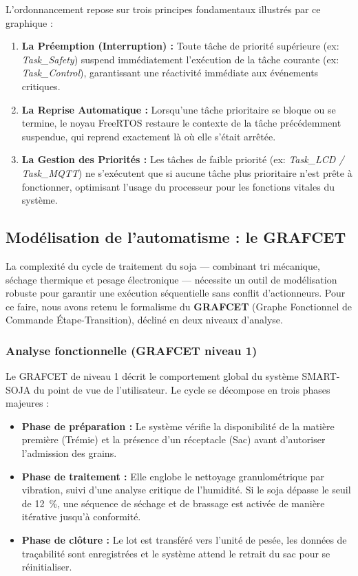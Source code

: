 L'ordonnancement repose sur trois principes fondamentaux illustrés par ce graphique :
\begin{enumerate}
    \item \textbf{La Préemption (Interruption) :} Toute tâche de priorité supérieure (ex: \textit{Task\_Safety}) suspend immédiatement l'exécution de la tâche courante (ex: \textit{Task\_Control}), garantissant une réactivité immédiate aux événements critiques.
    \item \textbf{La Reprise Automatique :} Lorsqu'une tâche prioritaire se bloque ou se termine, le noyau FreeRTOS restaure le contexte de la tâche précédemment suspendue, qui reprend exactement là où elle s'était arrêtée.
    \item \textbf{La Gestion des Priorités :} Les tâches de faible priorité (ex: \textit{Task\_LCD / Task\_MQTT}) ne s'exécutent que si aucune tâche plus prioritaire n'est prête à fonctionner, optimisant l'usage du processeur pour les fonctions vitales du système.
\end{enumerate}

\subsection{Modélisation de l'automatisme : le GRAFCET}

La complexité du cycle de traitement du soja — combinant tri mécanique, séchage thermique et pesage électronique — nécessite un outil de modélisation robuste pour garantir une exécution séquentielle sans conflit d'actionneurs. Pour ce faire, nous avons retenu le formalisme du \textbf{GRAFCET} (Graphe Fonctionnel de Commande Étape-Transition), décliné en deux niveaux d'analyse.

\subsubsection{Analyse fonctionnelle (GRAFCET niveau 1)}

Le GRAFCET de niveau 1 décrit le comportement global du système SMART-SOJA du point de vue de l'utilisateur. Le cycle se décompose en trois phases majeures :
\begin{itemize}
    \item \textbf{Phase de préparation :} Le système vérifie la disponibilité de la matière première (Trémie) et la présence d'un réceptacle (Sac) avant d'autoriser l'admission des grains.
    \item \textbf{Phase de traitement :} Elle englobe le nettoyage granulométrique par vibration, suivi d'une analyse critique de l'humidité. Si le soja dépasse le seuil de 12~\%, une séquence de séchage et de brassage est activée de manière itérative jusqu'à conformité.
    \item \textbf{Phase de clôture :} Le lot est transféré vers l'unité de pesée, les données de traçabilité sont enregistrées et le système attend le retrait du sac pour se réinitialiser.
\end{itemize}

